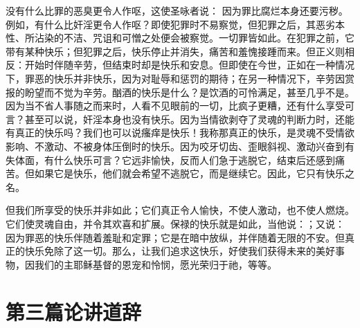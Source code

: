 没有什么比罪的恶臭更令人作呕，这使圣咏者说：  因为罪比腐烂本身还要污秽。例如，有什么比奸淫更令人作呕？即使犯罪时不易察觉，但犯罪之后，其恶劣本性、所沾染的不洁、咒诅和可憎之处便会被察觉。一切罪皆如此。在犯罪之前，它带有某种快乐；但犯罪之后，快乐停止并消失，痛苦和羞愧接踵而来。但正义则相反：开始时伴随辛劳，但结束时却是快乐和安息。但即使在今世，正如在一种情况下，罪恶的快乐并非快乐，因为对耻辱和惩罚的期待；在另一种情况下，辛劳因赏报的盼望而不觉为辛劳。酗酒的快乐是什么？是饮酒的可怜满足，甚至几乎不是。因为当不省人事随之而来时，人看不见眼前的一切，比疯子更糟，还有什么享受可言？甚至可以说，奸淫本身也没有快乐。因为当情欲剥夺了灵魂的判断力时，还能有真正的快乐吗？我们也可以说瘙痒是快乐！我称那真正的快乐，是灵魂不受情欲影响、不激动、不被身体压倒时的快乐。因为咬牙切齿、歪眼斜视、激动兴奋到有失体面，有什么快乐可言？它远非愉快，反而人们急于逃脱它，结束后还感到痛苦。但如果它是快乐，他们就会希望不逃脱它，而是继续它。因此，它只有快乐之名。\par

但我们所享受的快乐并非如此；它们真正令人愉快，不使人激动，也不使人燃烧。它们使灵魂自由，并令其欢喜和扩展。保禄的快乐就是如此，当他说：；又说：  因为罪恶的快乐伴随着羞耻和定罪；它是在暗中放纵，并伴随着无限的不安。但真正的快乐免除了这一切。那么，让我们追求这快乐，好使我们获得未来的美好事物，因我们的主耶稣基督的恩宠和怜悯，愿光荣归于祂，等等。\par



\section{第三篇论讲道辞}

\par

\par

